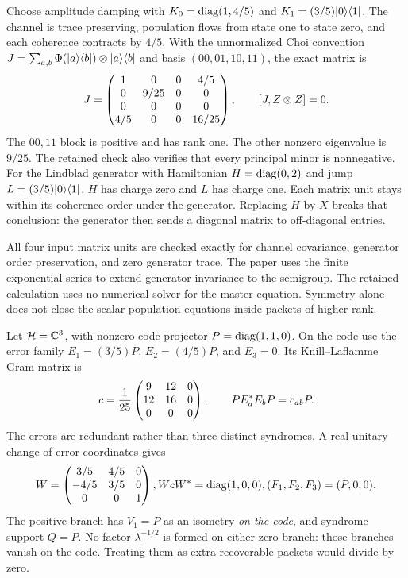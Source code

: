 Choose amplitude damping with $K_0=\operatorname{diag}(1,4/5)$ and $K_1=(3/5)\lvert 0\rangle\langle 1\rvert$. The channel is trace preserving, population flows from state one to state zero, and each coherence contracts by $4/5$.
With the unnormalized Choi convention $J=\sum_{a,b}\Phi(\lvert a\rangle\langle b\rvert)\otimes\lvert a\rangle\langle b\rvert$ and basis $(00,01,10,11)$, the exact matrix is
\[
J=\begin{pmatrix}1&0&0&4/5\\0&9/25&0&0\\0&0&0&0\\4/5&0&0&16/25\end{pmatrix},
\qquad [J,Z\otimes Z]=0.
\]
The $00,11$ block is positive and has rank one. The other nonzero eigenvalue is $9/25$. The retained check also verifies that every principal minor is nonnegative.
For the Lindblad generator with Hamiltonian $H=\operatorname{diag}(0,2)$ and jump $L=(3/5)\lvert 0\rangle\langle 1\rvert$, $H$ has charge zero and $L$ has charge one. Each matrix unit stays within its coherence order under the generator. Replacing $H$ by $X$ breaks that conclusion: the generator then sends a diagonal matrix to off-diagonal entries.

All four input matrix units are checked exactly for channel covariance, generator order preservation, and zero generator trace. The paper uses the finite exponential series to extend generator invariance to the semigroup. The retained calculation uses no numerical solver for the master equation. Symmetry alone does not close the scalar population equations inside packets of higher rank.

Let $\HH=\CC^3$, with nonzero code projector $P=\operatorname{diag}(1,1,0)$. On the code use the error family $E_1=(3/5)P$, $E_2=(4/5)P$, and $E_3=0$. Its Knill--Laflamme Gram matrix is
\[
c=\frac1{25}\begin{pmatrix}9&12&0\\12&16&0\\0&0&0\end{pmatrix},
\qquad PE_a^*E_bP=c_{ab}P.
\]
The errors are redundant rather than three distinct syndromes. A real unitary change of error coordinates gives
\[
W=\begin{pmatrix}3/5&4/5&0\\-4/5&3/5&0\\0&0&1\end{pmatrix},
 WcW^*=\operatorname{diag}(1,0,0),
(F_1,F_2,F_3)=(P,0,0).
\]
The positive branch has $V_1=P$ as an isometry \emph{on the code}, and syndrome support $Q=P$. No factor $\lambda^{-1/2}$ is formed on either zero branch: those branches vanish on the code. Treating them as extra recoverable packets would divide by zero.

